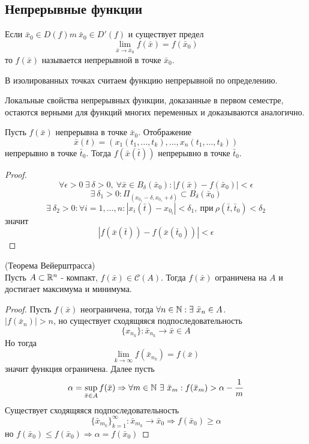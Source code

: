 \subsection{Непрерывные функции}
\begin{definition}
    Если $\bar{x}_0\in D(f)m\ \bar{x}_0\in D'(f)$ и существует предел 
    \[\lim\limits_{\bar{x}\to \bar{x}_0}f(\bar{x})=f(\bar{x}_0)\]
    то $f(\bar{x})$ называется непрерывной в точке $\bar{x}_0$.
\end{definition} 
\begin{comm}
    В изолированных точках считаем функцию непрерывной по определению.
\end{comm} 
\begin{comm}
    Локальные свойства непрерывных функции, доказанные в первом семестре, остаются
    верными для функций многих переменных и доказываются аналогично.
\end{comm} 
\begin{theorem}
    Пусть $f(\bar{x})$ непрерывна в точке $\bar{x}_0$. Отображение
    \[\bar{x}(t)=(x_1(t_1,\dots,t_k), \dots , x_n(t_1, \dots, t_k))\]
    непрерывно в точке $\bar{t}_0$. Тогда $f(\bar{x}(\bar{t}))$ непрерывно в точке $\bar{t}_0$.
\end{theorem} 
\begin{proof}
    \[\forall \epsilon>0\ \exists\ \delta>0,\ \forall \bar{x}\in B_{\delta}(\bar{x}_0): |f(\bar{x})-f(\bar{x}_0)|<\epsilon\]
    \[\exists\ \delta_1>0: \Pi_{(x_{0_1}-\delta, x_{0_1}+\delta)}\subset B_{\delta}(\bar{x}_0)\]
    \[\exists\ \delta_2>0: \forall i=1,\dots, n: |x_i(\bar{t})-x_{0_i}|<\delta_1,\ \text{при}\ \rho(\bar{t}, \bar{t}_0)<\delta_2\]
    значит
    \[|f(\bar{x}(\bar{t}))-f(\bar{x}(\bar{t}_0))|<\epsilon\]
\end{proof}
\begin{theorem} (Теорема Вейерштрасса)\\
    Пусть $A\subset \mathbb{R}^n$ - компакт, $f(\bar{x})\in \mathcal{C}(A)$. Тогда $f(\bar{x})$ ограничена на $A$ и достигает максимума и минимума.
\end{theorem} 
\begin{proof}
    Пусть $f(\bar{x})$ неограничена, тогда $\forall n\in \N: \exists\ \bar{x}_n\in A$.\\
    $|f(\bar{x}_n)|>n$, но существует сходящяяся подпоследовательность
    \[\{x_{n_k}\}: \bar{x}_{n_k}\to \bar{x}\in A\] 
    Но тогда
    \[\lim\limits_{k\to \infty}f(\bar{x}_{n_k})=f(\bar{x})\]
    значит функция ограничена.
    Далее пусть \[\alpha=\sup\limits_{\bar{x}\in A}f(\bar{x}) \Rightarrow \forall m\in \mathbb{N}\ \exists\ \bar{x}_m: f(\bar{x}_m)>\alpha-\frac{1}{m}\] 
    Существует сходящяяся подпоследовательность
    \[\{\bar{x}_{m_k}\}_{k=1}^{\infty}: \bar{x}_{m_k}\to \bar{x}_0 \Rightarrow f(\bar{x}_0)\geq \alpha\] но $f(\bar{x}_0)\leq f(\bar{x}_0) \Rightarrow \alpha= f(\bar{x}_0)$ 
\end{proof} 
